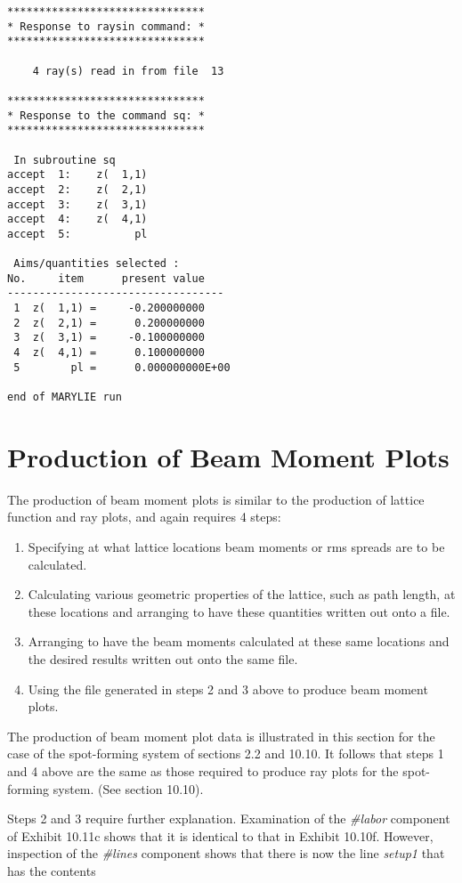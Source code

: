 \begin{footnotesize}
\begin{verbatim}
*******************************
* Response to raysin command: *
*******************************

    4 ray(s) read in from file  13

*******************************
* Response to the command sq: *
*******************************

 In subroutine sq
accept  1:    z(  1,1)
accept  2:    z(  2,1)
accept  3:    z(  3,1)
accept  4:    z(  4,1)
accept  5:          pl

 Aims/quantities selected :
No.     item      present value
----------------------------------
 1  z(  1,1) =     -0.200000000
 2  z(  2,1) =      0.200000000
 3  z(  3,1) =     -0.100000000
 4  z(  4,1) =      0.100000000
 5        pl =      0.000000000E+00

end of MARYLIE run
\end{verbatim}
\end{footnotesize}

\section{Production of Beam Moment Plots}  
\label{prodbeam}
The production of beam moment plots is similar to the production of
lattice function and ray plots, and again requires 4 steps:

\begin{enumerate}
\item Specifying at what lattice locations beam moments or rms spreads
are to be calculated.
\item Calculating various geometric properties of the lattice, such as
path length, at these locations and arranging to have these
quantities written out onto a file.
\item Arranging to have the beam moments calculated at these same locations
and the desired results written out onto the same file.
\item Using the file generated in steps 2 and 3 above to produce beam
moment plots.
\end{enumerate}
The production of beam moment plot data is illustrated in this section
for the case of the spot-forming system of sections 2.2 and 10.10.  It
follows that steps 1 and 4 above are the same as those required to
produce ray plots for the spot-forming system.  (See section 10.10).

Steps 2 and 3 require further explanation.  Examination of the {\em \#labor}
component of Exhibit 10.11c shows that it is identical to that in Exhibit
10.10f.  However, inspection of the {\em \#lines} component shows that
there is now the line {\em setup1} that has the contents

